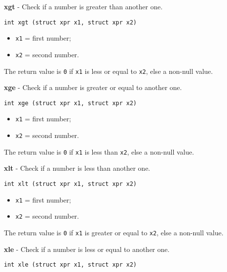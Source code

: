 \documentclass{article}
\begin{document}
\textbf{xgt} - Check if a number is greater than another one.

\begin{verbatim}
int xgt (struct xpr x1, struct xpr x2)
\end{verbatim}

\begin{itemize}
\item \texttt{x1} = first number;
\item \texttt{x2} = second number.
\end{itemize}

The return value is \texttt{0} if \texttt{x1} is less or equal to \texttt{x2}, 
else a non-null value.


\hrulefill{}

\textbf{xge} - Check if a number is greater or equal to another one.

\begin{verbatim}
int xge (struct xpr x1, struct xpr x2)
\end{verbatim}

\begin{itemize}
\item \texttt{x1} = first number;
\item \texttt{x2} = second number.
\end{itemize}

The return value is \texttt{0} if \texttt{x1} is less than \texttt{x2},
else a non-null value.


\hrulefill{}

\textbf{xlt} - Check if a number is less than another one.

\begin{verbatim}
int xlt (struct xpr x1, struct xpr x2)
\end{verbatim}

\begin{itemize}
\item \texttt{x1} = first number;
\item \texttt{x2} = second number.
\end{itemize}

The return value is \texttt{0} if \texttt{x1} is greater or equal to \texttt{x2},
else a non-null value.


\hrulefill{}

\textbf{xle} - Check if a number is less or equal to another one.

\begin{verbatim}
int xle (struct xpr x1, struct xpr x2)
\end{verbatim}
\end{document}

